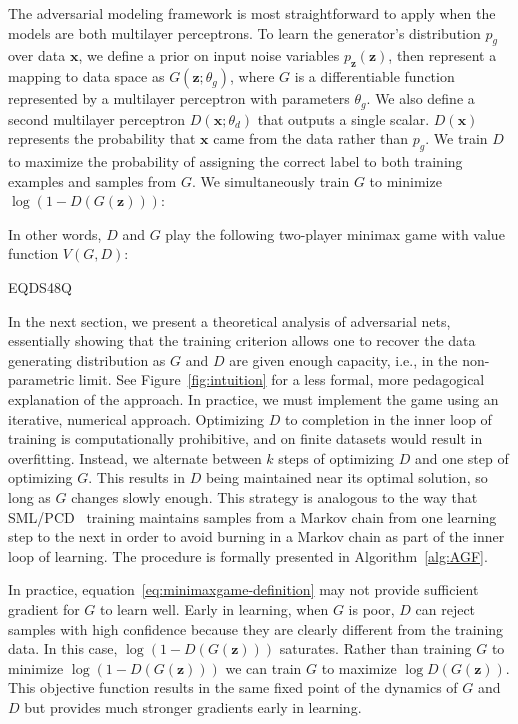 \documentclass{article}
\begin{document}
The adversarial modeling framework is most straightforward to apply when the models are both
multilayer perceptrons. To learn the generator's distribution $p_g$ over data $\bm{x}$, we
define a prior on input noise variables $p_{\bm{z}}(\bm{z})$, then represent a
mapping to data space as $G(\bm{z}; \theta_g)$, where $G$ is a differentiable function
represented by a multilayer perceptron with parameters $\theta_g$. We also define a second
multilayer perceptron $D(\bm{x}; \theta_d)$ that outputs a single scalar. $D(\bm{x})$ represents
the probability that $\bm{x}$ came from the data rather than $p_g$. We train $D$ to maximize the
probability of assigning the correct label to both training examples and samples from $G$.
We simultaneously train $G$ to minimize $\log(1-D(G(\bm{z})))$:

In other words, $D$ and $G$ play the following two-player minimax game with value function $V(G, D)$: 

EQDS48Q

In the next section, we present a theoretical analysis of adversarial nets,
essentially showing that the training criterion allows one to recover the data
generating distribution as $G$ and $D$ are given enough capacity, i.e., in the
non-parametric limit. See Figure~\ref{fig:intuition} for a less formal, more pedagogical
explanation of the approach.
In practice, we must implement the game using an iterative, numerical approach. Optimizing $D$ to completion in the
inner loop of training is computationally prohibitive,
and on finite datasets would result in overfitting. Instead, we alternate between $k$ steps
of optimizing $D$ and one step of optimizing $G$. This results in $D$ being maintained
near its optimal solution, so long as $G$ changes slowly enough. This strategy is analogous
to the way that SML/PCD~\citep{Younes1999,Tieleman08} training maintains samples from a Markov chain from one
learning step to the next in order to avoid burning in a Markov chain as part of the inner loop
of learning. The procedure is formally presented
in Algorithm~\ref{alg:AGF}.

In practice, equation~\ref{eq:minimaxgame-definition} may not provide sufficient gradient for $G$ to learn
well. Early in learning, when $G$ is poor, $D$ can reject samples with high confidence because they are
clearly different from the training data. In this case, $\log ( 1- D(G(\bm{z})))$ saturates. Rather than
training $G$ to minimize $\log (1 - D(G(\bm{z})))$ we can train $G$ to maximize $\log D(G(\bm{z}))$.
This objective function results in the same fixed point of the dynamics of $G$ and $D$ but provides much
stronger gradients early in learning.
\end{document}
